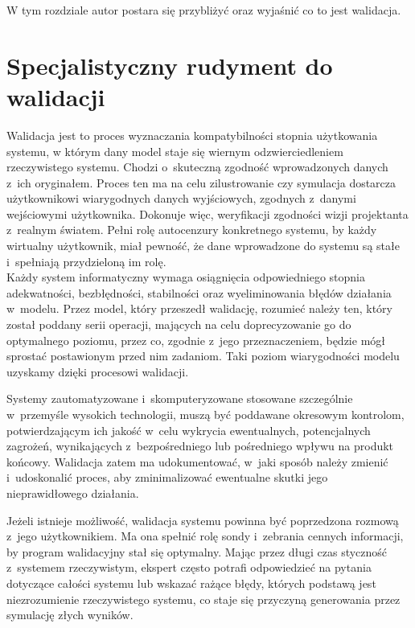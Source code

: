 \documentclass[brudnopis]{xmgr}
\begin{document}
W tym rozdziale autor postara się przybliżyć oraz wyjaśnić co to jest walidacja.

\section{Specjalistyczny rudyment do walidacji}

\indent \indent \indent \textcolor{sb}{Walidacja jest to proces wyznaczania kompatybilności stopnia użytkowania systemu,} \textcolor{sa}{w którym dany model staje się wiernym odzwierciedleniem rzeczywistego systemu.} \textcolor{sb}{Chodzi o~skuteczną zgodność wprowadzonych danych z~ich oryginałem.} \textcolor{sa}{Proces ten ma na celu zilustrowanie czy symulacja dostarcza użytkownikowi wiarygodnych danych wyjściowych, zgodnych z~danymi wejściowymi użytkownika. Dokonuje więc, weryfikacji zgodności wizji projektanta z~realnym światem. Pełni rolę autocenzury konkretnego systemu, by każdy wirtualny użytkownik, miał pewność, że dane wprowadzone do systemu są stałe i~spełniają przydzieloną im rolę.}
\\
\indent \textcolor{sb}{Każdy system informatyczny wymaga osiągnięcia odpowiedniego stopnia adekwatności, bezbłędności, stabilności oraz wyeliminowania błędów działania w~modelu}. \textcolor{sa}{Przez model, który przeszedł walidację, rozumieć należy ten, który został poddany serii operacji,} \textcolor{sa}{mających na celu doprecyzowanie go do optymalnego poziomu, przez co, zgodnie z~jego przeznaczeniem, będzie mógł sprostać postawionym przed nim zadaniom. Taki poziom wiarygodności modelu uzyskamy dzięki procesowi walidacji.}

\textcolor{sb}{Systemy zautomatyzowane i~skomputeryzowane stosowane szczególnie w~przemyśle wysokich technologii, muszą być poddawane okresowym kontrolom,} \textcolor{sa}{potwierdzającym ich jakość w~celu wykrycia ewentualnych, potencjalnych zagrożeń, wynikających z~bezpośredniego lub pośredniego wpływu na produkt końcowy. Walidacja zatem ma udokumentować, w~jaki sposób należy zmienić i~udoskonalić proces, aby zminimalizować ewentualne skutki jego nieprawidłowego działania.}

\textcolor{sb}{Jeżeli istnieje możliwość, walidacja systemu powinna być poprzedzona rozmową z~jego użytkownikiem.} \textcolor{sa}{Ma ona spełnić rolę sondy i~zebrania cennych informacji, by program walidacyjny stał się optymalny.} \textcolor{sb}{Mając przez długi czas styczność z~systemem rzeczywistym, ekspert często potrafi odpowiedzieć na pytania dotyczące całości systemu lub wskazać rażące błędy,} \textcolor{sa}{których podstawą jest niezrozumienie rzeczywistego systemu, co staje się przyczyną generowania przez symulację złych wyników.} \cite{Validation}
\end{document}
